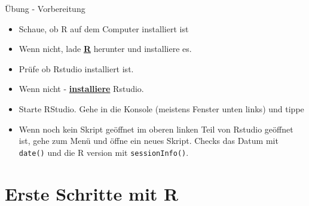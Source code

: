 \documentclass[ignorenonframetext,]{beamer}
\begin{document}
\begin{frame}[fragile]{Übung - Vorbereitung}

\begin{itemize}
\item
  Schaue, ob R auf dem Computer installiert ist
\item
  Wenn nicht, lade \href{r-project.org}{\textbf{R}} herunter und
  installiere es.
\item
  Prüfe ob Rstudio installiert ist.
\item
  Wenn nicht - \href{http://www.rstudio.com/}{\textbf{installiere}}
  Rstudio.
\item
  Starte RStudio. Gehe in die Konsole (meistens Fenster unten links) und
  tippe
\item
  Wenn noch kein Skript geöffnet im oberen linken Teil von Rstudio
  geöffnet ist, gehe zum Menü und öffne ein neues Skript. Checks das
  Datum mit \texttt{date()} und die R version mit
  \texttt{sessionInfo()}.
\end{itemize}

\end{frame}

\section{Erste Schritte mit R}\label{erste-schritte-mit-r}
\end{document}
